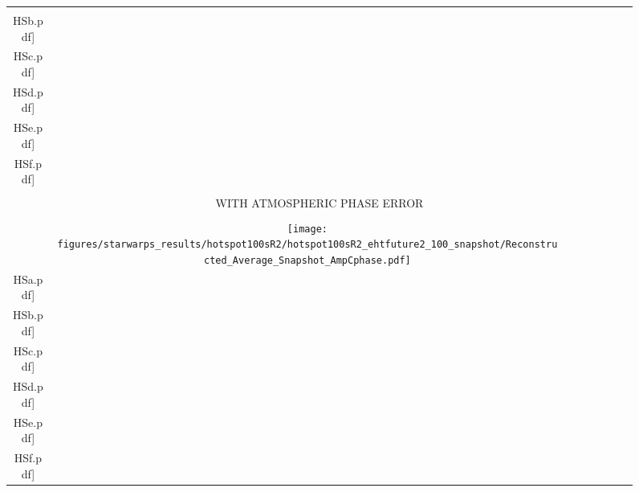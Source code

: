 \begin{figure}
\begin{center}
\begin{tabular}{  c | c | c  c  c  c  c c }
			\texttt{[image: figures/starwarps\_results/hotspot100sR2/ehtfuture2\_100\_visibility/best/frames/mean\_noaxis\_\\HSb.pdf]} &
			\texttt{[image: figures/starwarps\_results/hotspot100sR2/ehtfuture2\_100\_visibility/best/frames/mean\_noaxis\_\\HSc.pdf]} &
			\texttt{[image: figures/starwarps\_results/hotspot100sR2/ehtfuture2\_100\_visibility/best/frames/mean\_noaxis\_\\HSd.pdf]} &
			\texttt{[image: figures/starwarps\_results/hotspot100sR2/ehtfuture2\_100\_visibility/best/frames/mean\_noaxis\_\\HSe.pdf]} &
			\texttt{[image: figures/starwarps\_results/hotspot100sR2/ehtfuture2\_100\_visibility/best/frames/mean\_noaxis\_\\HSf.pdf]} 
			\\ \hline  	
			&\vspace{-.1in} &&&&&&\\
			\multicolumn{8}{c}{  \large{\textsf{WITH ATMOSPHERIC PHASE ERROR }}  }
			\\ \hline
			&\vspace{-.1in} &&&&&&\\
			\multirow{1}{*}[.6in]{ \rotatebox[origin=t]{90}{\small{\textsf{Snapshot}} }}
			&
			{{\texttt{[image: figures/starwarps\_results/hotspot100sR2/hotspot100sR2\_ehtfuture2\_100\_snapshot/Reconstructed\_Average\_Snapshot\_AmpCphase.pdf]}} } &
			\texttt{[image: figures/starwarps\_results/hotspot100sR2/hotspot100sR2\_ehtfuture2\_100\_snapshot/Reconstructed\_Snapshot\_AmpCphase\_\\HSa.pdf]} &
			\texttt{[image: figures/starwarps\_results/hotspot100sR2/hotspot100sR2\_ehtfuture2\_100\_snapshot/Reconstructed\_Snapshot\_AmpCphase\_\\HSb.pdf]} &
			\texttt{[image: figures/starwarps\_results/hotspot100sR2/hotspot100sR2\_ehtfuture2\_100\_snapshot/Reconstructed\_Snapshot\_AmpCphase\_\\HSc.pdf]} &
			\texttt{[image: figures/starwarps\_results/hotspot100sR2/hotspot100sR2\_ehtfuture2\_100\_snapshot/Reconstructed\_Snapshot\_AmpCphase\_\\HSd.pdf]} &
			\texttt{[image: figures/starwarps\_results/hotspot100sR2/hotspot100sR2\_ehtfuture2\_100\_snapshot/Reconstructed\_Snapshot\_AmpCphase\_\\HSe.pdf]} &
			\texttt{[image: figures/starwarps\_results/hotspot100sR2/hotspot100sR2\_ehtfuture2\_100\_snapshot/Reconstructed\_Snapshot\_AmpCphase\_\\HSf.pdf]}  \\

\end{tabular}
\end{center}
\end{figure}
